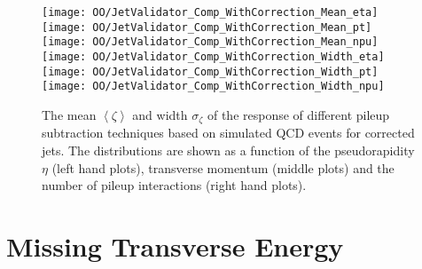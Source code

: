 \begin{figure}[h!t]
  \centering
  \texttt{[image: OO/JetValidator\_Comp\_WithCorrection\_Mean\_eta]}
  \texttt{[image: OO/JetValidator\_Comp\_WithCorrection\_Mean\_pt]}
  \texttt{[image: OO/JetValidator\_Comp\_WithCorrection\_Mean\_npu]}
  \\
  \texttt{[image: OO/JetValidator\_Comp\_WithCorrection\_Width\_eta]}
  \texttt{[image: OO/JetValidator\_Comp\_WithCorrection\_Width\_pt]}
  \texttt{[image: OO/JetValidator\_Comp\_WithCorrection\_Width\_npu]}
  \caption[Mean and width of the \pt{} response for different pileup subtraction techniques based on simulated QCD events for corrected jets]{The mean $\left<\zeta\right>$ and width $\sigma_{\zeta}$ of the \pt{} response of different pileup subtraction techniques based on simulated QCD events for corrected jets. The distributions are shown as a function of the pseudorapidity $\eta$ (left hand plots), transverse momentum (middle plots) and the number of pileup interactions (right hand plots). \label{plot:OOJetsPtResponseCompW}}
\end{figure}



\section{Missing Transverse Energy \label{sec:OOMet}}

